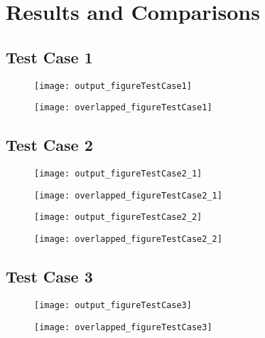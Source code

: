 \chapter{Results and Comparisons} 
\label{ch:results} 

\section{Test Case 1}

\begin{figure}
  \centering
  \texttt{[image: output\_figureTestCase1]}
  \caption{}\label{figure_testcase1}
\end{figure}
\begin{figure}
  \centering
  \texttt{[image: overlapped\_figureTestCase1]}
  \caption{}\label{figure_testcase1_overlapped}
\end{figure}

\section{Test Case 2}

\begin{figure}
  \centering
  \texttt{[image: output\_figureTestCase2\_1]}
  \caption{}\label{figure_testcase2_1}
\end{figure}

\begin{figure}
  \centering
  \texttt{[image: overlapped\_figureTestCase2\_1]}
  \caption{}\label{figure_testcase2_1_overlapped}
\end{figure}

\begin{figure}
  \centering
  \texttt{[image: output\_figureTestCase2\_2]}
  \caption{}\label{figure_testcase2_2}
\end{figure}

\begin{figure}
  \centering
  \texttt{[image: overlapped\_figureTestCase2\_2]}
  \caption{}\label{figure_testcase2_2_overlapped}
\end{figure}

\section{Test Case 3}

\begin{figure}
  \centering
  \texttt{[image: output\_figureTestCase3]}
  \caption{}\label{figure_testcase3}
\end{figure}
\begin{figure}
  \centering
  \texttt{[image: overlapped\_figureTestCase3]}
  \caption{}\label{figure_testcase3_overlapped}
\end{figure}

